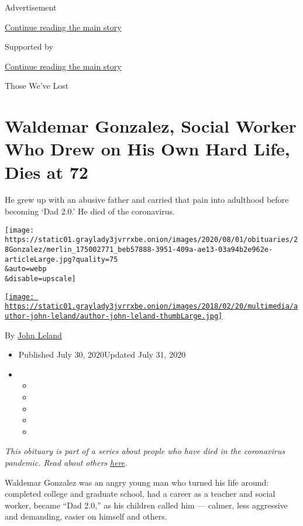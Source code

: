 Advertisement

\protect\hyperlink{after-top}{Continue reading the main story}

Supported by

\protect\hyperlink{after-sponsor}{Continue reading the main story}

Those We've Lost

\hypertarget{waldemar-gonzalez-social-worker-who-drew-on-his-own-hard-life-dies-at-72}{%
\section{Waldemar Gonzalez, Social Worker Who Drew on His Own Hard Life,
Dies at
72}\label{waldemar-gonzalez-social-worker-who-drew-on-his-own-hard-life-dies-at-72}}

He grew up with an abusive father and carried that pain into adulthood
before becoming `Dad 2.0.' He died of the coronavirus.

\texttt{[image: https://static01.graylady3jvrrxbe.onion/images/2020/08/01/obituaries/28Gonzalez/merlin\_175002771\_beb57888-3951-409a-ae13-03a94b2e962e-articleLarge.jpg?quality=75\\\&auto=webp\\\&disable=upscale]}

\href{https://www.nytimes3xbfgragh.onion/by/john-leland}{\texttt{[image: https://static01.graylady3jvrrxbe.onion/images/2018/02/20/multimedia/author-john-leland/author-john-leland-thumbLarge.jpg]}}

By \href{https://www.nytimes3xbfgragh.onion/by/john-leland}{John Leland}

\begin{itemize}
\item
  Published July 30, 2020Updated July 31, 2020
\item
  \begin{itemize}
  \item
  \item
  \item
  \item
  \item
  \end{itemize}
\end{itemize}

\emph{This obituary is part of a series about people who have died in
the coronavirus pandemic. Read about others}
\href{https://www.nytimes3xbfgragh.onion/interactive/2020/obituaries/people-died-coronavirus-obituaries.html}{\emph{here}}\emph{.}

Waldemar Gonzalez was an angry young man who turned his life around:
completed college and graduate school, had a career as a teacher and
social worker, became ``Dad 2.0,'' as his children called him ---
calmer, less aggressive and demanding, easier on himself and others.

